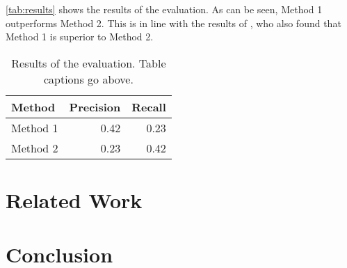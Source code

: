 \documentclass[seminar]{plai}
\begin{document}
\lipsum[1-3]

\autoref{tab:results} shows the results of the evaluation. As can be seen, Method 1 outperforms Method 2. This is in line with the results of \citet{phdthesis-kinder}, who also found that Method 1 is superior to Method 2. 

\begin{table}[t]
    \centering
    \caption{Results of the evaluation. Table captions go above.}
    \label{tab:results}
    \begin{tabularx}{.7\linewidth}{Xrr}
        \toprule
        \textbf{Method} & \textbf{Precision} & \textbf{Recall} \\
        \midrule
        Method 1 & 0.42 & 0.23 \\
        Method 2 & 0.23 & 0.42 \\
        \bottomrule
    \end{tabularx}
\end{table}

\lipsum[1-3]


\section{Related Work}
\label{sec:related-work}

\lipsum[1-3]


\section{Conclusion}
\label{sec:conclusion}

\lipsum[1]



\end{document}
